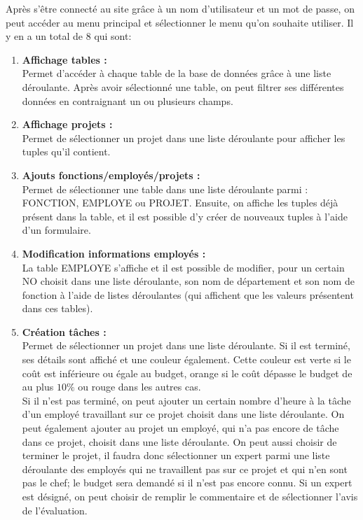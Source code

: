 \documentclass[a4paper, 11pt]{article}
\begin{document}
Après s'être connecté au site grâce à un nom d'utilisateur et un mot de passe, on peut accéder au menu principal et sélectionner le menu qu'on souhaite utiliser. Il y en a un total de 8 qui sont:\\
\begin{enumerate}

    \item \textbf{Affichage tables :}\\
Permet d'accéder à chaque table de la base de données grâce à une liste déroulante. Après avoir sélectionné une table, on peut filtrer ses différentes données en contraignant un ou plusieurs champs.\\

\item \textbf{Affichage projets :}\\
Permet de sélectionner un projet dans une liste déroulante pour afficher les tuples qu'il contient.\\

\item \textbf{Ajouts fonctions/employés/projets :}\\
Permet de sélectionner une table dans une liste déroulante parmi : FONCTION, EMPLOYE ou PROJET. Ensuite, on affiche les tuples déjà présent dans la table, et il est possible d'y créer de nouveaux tuples à l'aide d'un formulaire.\\

\item \textbf{Modification informations employés :}\\
La table EMPLOYE s'affiche et il est possible de modifier, pour un certain NO choisit dans une liste déroulante, son nom de département et son nom de fonction à l'aide de listes déroulantes (qui affichent que les valeurs présentent dans ces tables).\\

\item \textbf{Création tâches :}\\
Permet de sélectionner un projet dans une liste déroulante. Si il est terminé, ses détails sont affiché et une couleur également. Cette couleur est verte si le coût est inférieure ou égale au budget, orange si le coût dépasse le budget de au plus $10\%$ ou rouge dans les autres cas.\\
Si il n'est pas terminé, on peut ajouter un certain nombre d'heure à la tâche d'un employé travaillant sur ce projet choisit dans une liste déroulante. On peut également ajouter au projet un employé, qui n'a pas encore de tâche dans ce projet, choisit dans une liste déroulante. On peut aussi choisir de terminer le projet, il faudra donc sélectionner un expert parmi une liste déroulante des employés qui ne travaillent pas sur ce projet et qui n'en sont pas le chef; le budget sera demandé si il n'est pas encore connu. Si un expert est désigné, on peut choisir de remplir le commentaire et de sélectionner l'avis de l'évaluation.\\


\end{enumerate}
\end{document}
